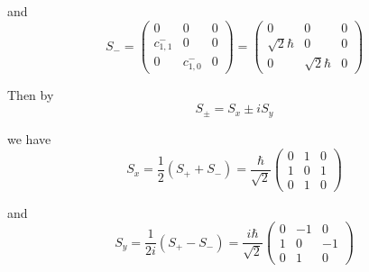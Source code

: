 and
\begin{equation*}
S_-=\begin{pmatrix}
0 & 0 & 0
\\
c_{1,1}^- & 0 & 0
\\
0 & c_{1,0}^- & 0
\end{pmatrix}
=\begin{pmatrix}
0 & 0 & 0
\\
\sqrt2\hbar & 0 & 0
\\
0 & \sqrt2\hbar & 0
\end{pmatrix}
\end{equation*}

Then by
\begin{equation*}
S_\pm=S_x\pm iS_y
\end{equation*}

we have
\begin{equation*}
S_x=\frac{1}{2}(S_++S_-)
=\frac{\hbar}{\sqrt2}
\begin{pmatrix}
0 & 1 & 0
\\
1 & 0 & 1
\\
0 & 1 & 0
\end{pmatrix}
\end{equation*}

and
\begin{equation*}
S_y=\frac{1}{2i}(S_+-S_-)
=\frac{i\hbar}{\sqrt2}
\begin{pmatrix}
0 & -1 & 0
\\
1 & 0 & -1
\\
0 & 1 & 0
\end{pmatrix}
\end{equation*}


